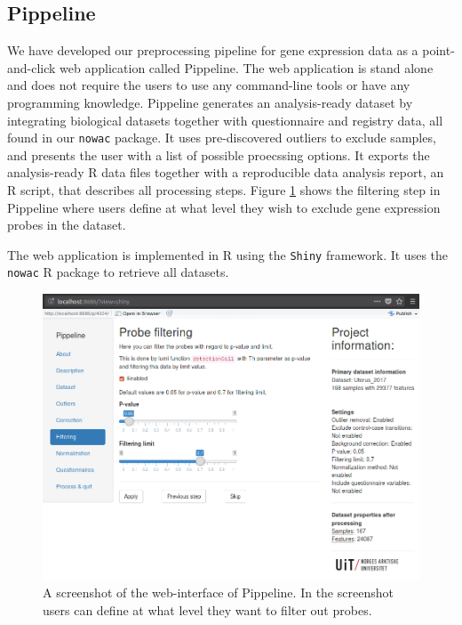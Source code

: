 \subsection{Pippeline} 
We have developed our preprocessing pipeline for gene expression data as a
point-and-click web application called Pippeline. The web application is stand
alone and does not require the users to use any command-line tools or have any
programming knowledge. Pippeline generates an analysis-ready dataset by
integrating biological datasets together with questionnaire and registry data,
all found in our \texttt{nowac} package. It uses pre-discovered outliers to
exclude samples, and presents the user with a list of possible proecssing
options. It exports the analysis-ready R data files together with a reproducible
data analysis report, an R script, that describes all processing steps.
Figure \ref{fig:scr_filtering} shows the filtering step in Pippeline where users
define at what level they wish to exclude gene expression probes in the dataset. 

The web application is implemented in R using the \texttt{Shiny} framework. It
uses the \texttt{nowac} R package to retrieve all datasets. 


\begin{figure}
    \includegraphics[width=\linewidth]{figures/scr_filtering.png}
  \caption{A screenshot of the web-interface of Pippeline. In the screenshot
    users can define at what level they want to filter out probes.}
  \label{fig:scr_filtering}
\end{figure}

